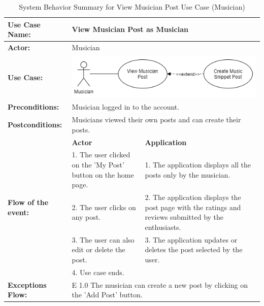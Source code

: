 \begin{longtable}{|p{3cm}|p{5cm}|p{5cm}|}
    \caption{\centering System Behavior Summary for View Musician Post Use Case (Musician)} \\
    \hline
    \textbf{Use Case Name:} & \multicolumn{2}{l|}{View Musician Post as Musician} \\ \hline
    \textbf{Actor:} & \multicolumn{2}{l|}{Musician} \\ \hline
    \textbf{Use Case:} & \multicolumn{2}{l|}{\includegraphics[width=0.5\linewidth]{mainmatter/images/sucd5.png}} \\ \hline
    \textbf{Preconditions:} & \multicolumn{2}{p{10cm}|}{Musician logged in to the account.} \\ \hline
    \textbf{Postconditions:} & \multicolumn{2}{p{10cm}|}{Musicians viewed their own posts and can create their posts.} \\ \hline
    \multirow{5}{3cm}{\raggedright \textbf{Flow of the event:}} & \textbf{Actor} & \textbf{Application} \\ \cline{2-3}
    & 1. The user clicked on the 'My Post' button on the home page. & 1. The application displays all the posts only by the musician. \\ \cline{2-3}
    & 2. The user clicks on any post. & 2. The application displays the post page with the ratings and reviews submitted by the enthusiasts. \\ \cline{2-3}
    & 3. The user can also edit or delete the post. & 3. The application updates or deletes the post selected by the user.  \\ \cline{2-3}
    & 4. Use case ends. &  \\ \hline
    \multirow{1}{3cm}{\raggedright \textbf{Exceptions Flow:}} & \multicolumn{2}{p{10cm}|}{\raggedright E 1.0 The musician can create a new post by clicking on the 'Add Post' button.} \\ \hline
\end{longtable}
\pagebreak


